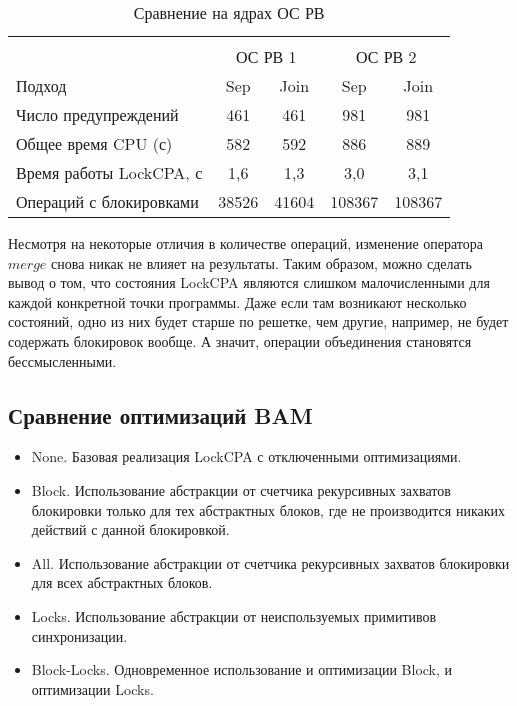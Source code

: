   \begin{table}[h]\footnotesize \centering
    \caption{Сравнение на ядрах ОС РВ}
  	\label{table-os-lock-merge}
    \begin{tabular}{ | l | c | c | c | c | }
      \hline
      		& 		\multicolumn{4}{c|}{\theory}  \\
      		& 		\multicolumn{2}{c|}{ОС РВ 1} & \multicolumn{2}{c|}{ОС РВ 2}  \\
      Подход         					& Sep 	& Join 	& Sep 	& Join   	\\ \hline
      Число предупреждений				& 461   & 461   & 981   & 981   	\\ 
  	  Общее время CPU (с) 				& 582 	& 592 	& 886   & 889     	\\ 
  \hspace{0.5cm} Время работы LockCPA, с & 1,6 	& 1,3 	& 3,0   & 3,1     	\\ \hline
   	  Операций с блокировками			& 38526 & 41604 & 108367 & 108367      	\\ 
      \hline
    \end{tabular}
  \end{table}


Несмотря на некоторые отличия в количестве операций, изменение оператора $merge$ снова никак не влияет на результаты.
Таким образом, можно сделать вывод о том, что состояния LockCPA являются слишком малочисленными для каждой конкретной точки программы.
Даже если там возникают несколько состояний, одно из них будет старше по решетке, чем другие, например, не будет содержать блокировок вообще. 
А значит, операции объединения становятся бессмысленными.

\subsection{Сравнение оптимизаций BAM}

\begin{itemize}
\item None. Базовая реализация LockCPA с отключенными оптимизациями.
\item Block. Использование абстракции от счетчика рекурсивных захватов блокировки только для тех абстрактных блоков, где не производится никаких действий с данной блокировкой.
\item All. Использование абстракции от счетчика рекурсивных захватов блокировки для всех абстрактных блоков.
\item Locks. Использование абстракции от неиспользуемых примитивов синхронизации.
\item Block-Locks. Одновременное использование и оптимизации Block, и оптимизации Locks.
\end{itemize}

